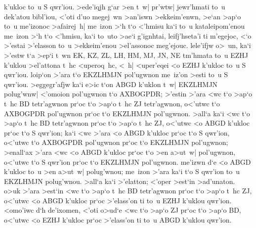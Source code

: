 \begin{Parallel}{}{}
{{k'ukloc to~u S qwr'iou. >ede'iqjh g`ar >en t~w| pr'wtw| jewr'hmati to~u dek'atou
bibl'iou, <'oti d'uo megej~wn >an'iswn >ekkeim'enwn, >e`an >ap`o to~u me'izonoc
>afairej~h| me~izon >`h t`o <'hmisu ka`i to~u kataleipom'enou me~izon >`h
t`o <'hmisu, ka`i to~uto >ae`i g'ignhtai, leifj'hseta'i ti m'egejoc, <`o >'estai >'elasson
to~u >ekkeim'enou >el'assonoc meg'ejouc. lele'ifjw o>~un, ka`i >'estw t`a >ep`i
t~wn EK, KZ, ZL, LH, HM, MJ, JN, NE tm'hmata to~u EZHJ k'uklou >el'attona
t~hc <uperoq~hc, <~h| <uper'eqei <o EZHJ k'ukloc to~u S qwr'iou. loip`on >'ara t`o EKZLHMJN pol'ugwnon
me~iz'on >esti to~u S qwr'iou.
 >eggegr'afjw ka`i e>ic t`on ABGD k'uklon t~w| EKZLHMJN
polug'wnw| <'omoion pol'ugwnon t`o AXBOGPDR; >'estin >'ara <wc t`o >ap`o
t~hc BD tetr'agwnon pr`oc t`o >ap`o t~hc ZJ tetr'agwnon, o<'utwc t`o
AXBOGPDR pol'ugwnon pr`oc t`o EKZLHMJN pol'ugwnon. >all`a ka`i <wc  t`o >ap`o t~hc BD tetr'agwnon pr`oc t`o >ap`o t~hc
ZJ, o<'utwc <o ABGD k'ukloc pr`oc t`o S qwr'ion; ka`i <wc >'ara <o ABGD k'ukloc
pr`oc t`o S qwr'ion, o<'utwc t`o AXBOGPDR pol'ugwnon pr`oc t`o EKZLHMJN
pol'ugwnon; >enall`ax >'ara <wc <o ABGD k'ukloc pr`oc t`o >en a>ut~w| pol'ugwnon, o<'utwc t`o S qwr'ion pr`oc t`o EKZLHMJN pol'ugwnon.  me'izwn d`e <o ABGD k'ukloc to~u >en a>ut~w| polug'wnou; me~izon >'ara ka`i t`o S qwr'ion to~u EKZLHMJN polug'wnou. >all`a
ka`i >'elatton; <'oper >est`in >ad'unaton. o>uk >'ara >est`in <wc t`o >ap`o t~hc BD tetr'agwnon pr`oc t`o >ap`o t~hc ZJ, o<'utwc <o ABGD k'ukloc pr`oc >'elass'on ti to~u EZHJ k'uklou qwr'ion. <omo'iwc d`h de'ixomen, <'oti o>ud`e <wc t`o >ap`o ZJ pr`oc
t`o >ap`o BD, o<'utwc <o EZHJ k'ukloc pr`oc >'elass'on ti to~u ABGD k'uklou qwr'ion.}



}
\end{Parallel}
